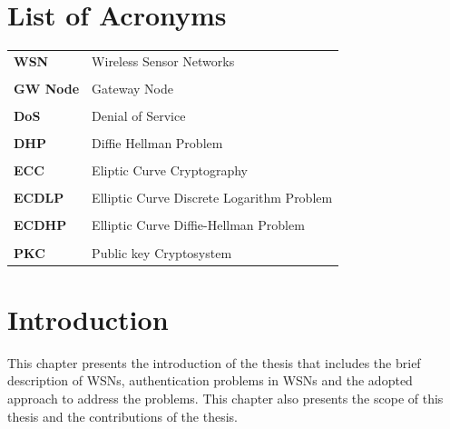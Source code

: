\documentclass[a4paper,12pt]{report}
\begin{document}
\chapter*{List of Acronyms}
\begin{tabular}{l l}
\textbf{WSN}  &     Wireless Sensor Networks\\
&\\
\textbf{GW Node} &  Gateway Node\\
&\\
\textbf{DoS}& Denial of Service\\
&\\
\textbf{DHP} & Diffie Hellman Problem\\
&\\
\textbf{ECC} & Eliptic Curve Cryptography\\
&\\
\textbf{ECDLP} & Elliptic Curve Discrete Logarithm Problem\\
&\\
\textbf{ECDHP} & Elliptic Curve Diffie-Hellman Problem\\
&\\
\textbf{PKC} & Public key Cryptosystem\\
\end{tabular}
\pagebreak

\afterpage{\null\newpage}

\chapter{Introduction}
\label{Ch1} \setcounter{page}{1} 
\bigskip
\bigskip
\bigskip
This chapter presents the introduction of the thesis that includes
the brief description of WSNs, authentication problems in WSNs and
the adopted approach to address the problems. This chapter also
presents the scope of this thesis and the contributions of the
thesis.
\end{document}
